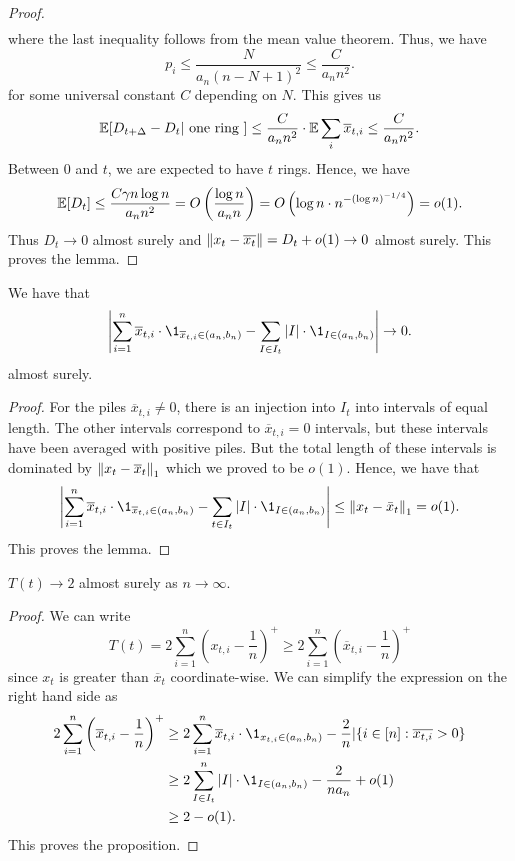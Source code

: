 \documentclass[12pt]{article}
\begin{document}
\begin{proof}
\begin{align*}
	\end{align*}
	where the last inequality follows from the mean value theorem. Thus, we have
	\[
		p_i \leq \frac{N}{a_n (n-N+1)^2} \leq \frac{C}{a_n n^2}.
	\]
	for some universal constant $C$ depending on $N$. This gives us 
	\[
		\mathbb{E} [D_{t + \Delta} - D_t | \text{ one ring }] \leq \frac{C}{a_n n^2} \cdot \mathbb{E} \sum_i \overline{x}_{t, i} \leq \frac{C}{a_n n^2}.
	\]
	Between $0$ and $t$, we are expected to have $t$ rings. Hence, we have 
	\[
		\mathbb{E} [D_t] \leq \frac{C \gamma n \log n}{a_n n^2} = O \left ( \frac{\log n}{a_n n} \right ) = O \left ( \log n \cdot n^{- (\log n)^{-1/4}} \right ) = o(1). 
	\]
	Thus $D_t \to 0$ almost surely and $\left\lVert x_t - \overline{x_t} \right\rVert = D_t + o(1) \to 0$ almost surely. This proves the lemma. 
\end{proof}

\begin{lem}
	We have that
	\[
		\left | \sum_{i = 1}^n \overline{x}_{t, i} \cdot \1_{\overline{x}_{t, i} \in (a_n, b_n)} - \sum_{I \in I_t} |I| \cdot \1_{I \in (a_n, b_n)} \right | \to 0. 
	\]
	almost surely. 
\end{lem}	
\begin{proof}
	For the piles $\overline{x}_{t, i} \neq 0$, there is an injection into $I_t$ into intervals of equal length. The other intervals correspond to $\overline{x}_{t, i} = 0$ intervals, but these intervals have been averaged with positive piles. But the total length of these intervals is dominated by $\left\lVert x_t - \overline{x}_t \right\rVert_1$ which we proved to be $o(1)$. Hence, we have that
	\[
		\left | \sum_{i = 1}^n \overline{x}_{t, i} \cdot \1_{\overline{x}_{t, i} \in (a_n, b_n)} - \sum_{t \in I_t} |I| \cdot \1_{I \in (a_n, b_n)} \right | \leq \norm{x_t - \bar{x}_t}_1 = o(1). 
	\]
	This proves the lemma. 
\end{proof}

\begin{prop}
	$T(t) \to 2$ almost surely as $n \to \infty$. 
\end{prop}
\begin{proof}
	We can write
	\[
		T(t) = 2 \sum_{i = 1}^n \left ( x_{t, i} - \frac{1}{n} \right )^+ \geq 2 \sum_{i = 1}^n \left ( \overline{x}_{t, i} - \frac{1}{n} \right )^+
	\]
	since $x_t$ is greater than $\overline{x}_t$ coordinate-wise. We can simplify the expression on the right hand side as
	\begin{align*}
		2 \sum_{i = 1}^n \left ( \overline{x}_{t, i} - \frac{1}{n} \right )^+ & \geq 2 \sum_{i = 1}^n \overline{x}_{t, i} \cdot \1_{x_{t, i} \in (a_n, b_n)} - \frac{2}{n} | \{ i \in [n] : \overline{x_{t, i}} > 0\} \\
		& \geq 2 \sum_{I \in I_t}^n |I| \cdot \1_{I \in (a_n, b_n)} - \frac{2}{n a_n} + o(1) \\
		& \geq 2 - o(1).
	\end{align*}
	This proves the proposition. 
\end{proof}
\end{document}
